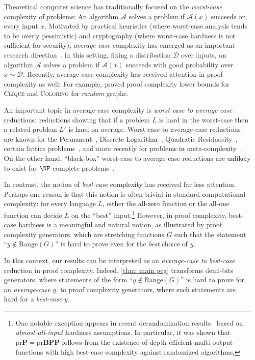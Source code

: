\documentclass[10pt,a4paper]{article}
\theoremstyle{definition}
\theoremstyle{remark}
\newcommand{\calA}{\mathcal{A}}
\newcommand{\calD}{\mathcal{D}}
\newcommand{\Range}{\mathrm{Range}}
\begin{document}
Theoretical computer science has traditionally focused on the \emph{worst-case} complexity of problems: An algorithm $\calA$ solves a problem if $\calA(x)$ succeeds on every input $x$. Motivated by practical heuristics (where worst-case analysis tends to be overly pessimistic) and cryptography (where worst-case hardness is not sufficient for security), \emph{average-case} complexity has emerged as an important research direction~\cite{Impagliazzo95, BogdanovT06}. In this setting, fixing a distribution $\calD$ over inputs, an algorithm $\calA$ solves a problem if $\calA(x)$ succeeds with good probability over $x\sim \calD$. Recently, average-case complexity has received attention in proof complexity as well: For example, \cite{Pang21,DSPR23,CDSNPR23} proved proof complexity lower bounds for \textsc{Clique} and \textsc{Coloring} for \emph{random} graphs.

An important topic in average-case complexity is \emph{worst-case to average-case} reductions: reductions showing that if a problem $L$ is hard in the worst-case then a related problem $L'$ is hard on average. Worst-case to average-case reductions are known for the Permanent~\cite{CaiPS99}, Discrete Logarithm~\cite{BlumM84}, Quadratic Residuosity~\cite{GoldwasserM84}, certain lattice problems~\cite{Ajtai96}, and more recently for problems in meta-complexity~\cite{Hirahara18}. On the other hand, ``black-box'' worst-case to average-case reductions are unlikely to exist for $\NP$-complete problems~\cite{FeigenbaumF93, BogdanovT06-reduction}.

In contrast, the notion of \emph{best-case} complexity has received far less attention. Perhaps one reason is that this notion is often trivial in standard computational complexity: for every language $L$, either the all-zero function or the all-one function can decide $L$ on the ``best'' input.\footnote{One notable exception appears in recent derandomization results~\cite{CT21-FOCS} based on \emph{almost-all-input} hardness assumptions. In particular, it was shown that $\mathrm{pr}\mathbf{P} = \mathrm{pr}\mathbf{BPP}$ follows from the existence of depth-efficient multi-output functions with high best-case complexity against randomized algorithms.} However, in proof complexity, best-case hardness is a meaningful and natural notion, as illustrated by proof complexity generators, which are stretching functions $G$ such that the statement ``$y\not\in\Range(G)$'' is hard to prove even for the \emph{best} choice of $y$.

In this context, our results can be interpreted as an \emph{average-case to best-case} reduction in proof complexity. Indeed, \autoref{thm: main pcg} transforms demi-bits generators, where statements of the form ``$y\not\in\Range(G)$'' is hard to prove for an \emph{average-case} $y$, to proof complexity generators, where such statements are hard for a \emph{best-case} $y$.
\end{document}
